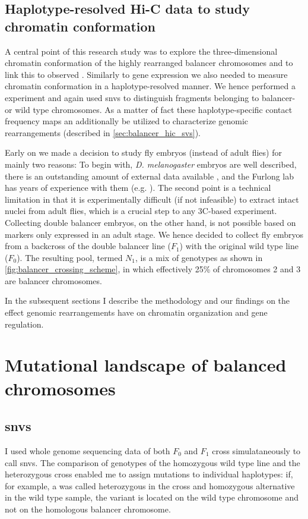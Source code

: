 \subsection{Haplotype-resolved Hi-C data to study chromatin conformation}
\label{sec:balancer_study_design_hic}

A central point of this research study was to explore the three-dimensional
chromatin conformation of the highly rearranged balancer chromosomes and to link
this to observed \ase. Similarly to gene expression we also needed to measure
chromatin conformation in a haplotype-resolved manner. We hence performed a \hic
experiment and again used \acp{snv} to distinguish fragments belonging to
balancer- or wild type chromosomes. As a matter of fact these haplotype-specific
contact frequency maps an additionally be utilized to characterize genomic
rearrangements (described in \cref{sec:balancer_hic_svs}).

Early on we made a decision to study fly embryos (instead of adult flies) for
mainly two reasons: To begin with, \textit{D. melanogaster} embryos are well
described, there is an outstanding amount of external data available
\citep{Gramates2017,Celniker2009}, and the Furlong lab has years of experience
with them (e.g. \cite{Furlong2001,Ghavi-Helm2014}). The second point is a
technical limitation in that it is experimentally difficult (if not infeasible)
to extract intact nuclei from adult flies, which is a crucial step to any
3C-based experiment. Collecting double balancer embryos, on the other hand, is
not possible based on markers only expressed in an adult stage. We hence decided
to collect fly embryos from a backcross of the double balancer line ($F_1$) with
the original wild type line ($F_0$). The resulting pool, termed $N_1$, is a mix
of genotypes as shown in \cref{fig:balancer_crossing_scheme}, in which
effectively 25\% of chromosomes 2 and 3 are balancer chromosomes.

In the subsequent sections I describe the methodology and our findings on the
effect genomic rearrangements have on chromatin organization and gene regulation.





\section{Mutational landscape of balanced chromosomes}
\label{sec:balancer_mutational_landscape}

\subsection{\Acp{snv}}
I used whole genome sequencing data of both $F_0$ and $F_1$ cross
simulataneously to call \acp{snv}. The comparison of genotypes of the homozygous
wild type line and the heterozygous cross enabled me to assign mutations to
individual haplotypes: if, for example, a \snv was called heterozygous in the
cross and homozygous alternative in the wild type sample, the variant is located
on the wild type chromosome and not on the homologous balancer chromosome.

